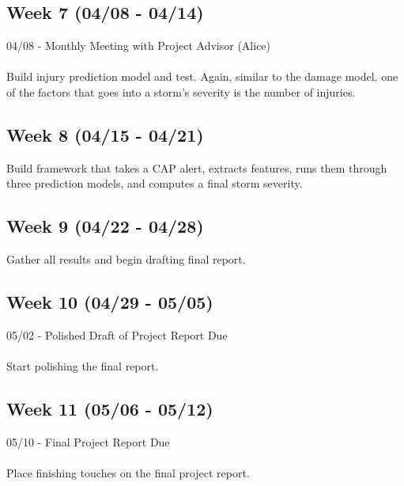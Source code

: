 \documentclass{article}
\begin{document}
\subsection*{Week 7 (04/08 - 04/14)}
04/08 - Monthly Meeting with Project Advisor (Alice)\\
\\
Build injury prediction model and test. Again, similar to the damage model, one of the factors that goes into a storm's severity is the number of injuries.

\subsection*{Week 8 (04/15 - 04/21)}
Build framework that takes a CAP alert, extracts features, runs them through three prediction models, and computes a final storm severity.

\subsection*{Week 9 (04/22 - 04/28)}
Gather all results and begin drafting final report.

\subsection*{Week 10 (04/29 - 05/05)}
05/02 - Polished Draft of Project Report Due\\
\\
Start polishing the final report.

\subsection*{Week 11 (05/06 - 05/12)}
05/10 - Final Project Report Due\\
\\
Place finishing touches on the final project report.



\end{document}
